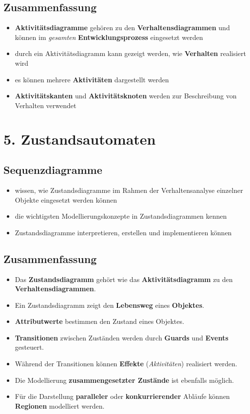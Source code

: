 \subsection*{Zusammenfassung}

\begin{itemize}
    \item \textbf{Aktivitätsdiagramme} gehören zu den \textbf{Verhaltensdiagrammen} und können im \textit{gesamten} \textbf{Entwicklungsprozess} eingesetzt werden
    \item durch ein Aktivitätsdiagramm kann gezeigt werden, wie \textbf{Verhalten} realisiert wird
    \item es können mehrere \textbf{Aktivitäten} dargestellt werden
    \item \textbf{Aktivitätskanten} und \textbf{Aktivitätsknoten} werden zur Beschreibung von Verhalten verwendet
\end{itemize}

\section*{5. Zustandsautomaten}

\subsection*{Sequenzdiagramme}
\begin{itemize}
    \item wissen, wie Zustandsdiagramme im Rahmen der Verhaltensanalyse einzelner Objekte eingesetzt werden können
    \item die wichtigsten Modellierungskonzepte in Zustandsdiagrammen kennen
    \item Zustandsdiagramme interpretieren, erstellen und implementieren können
\end{itemize}

\subsection*{Zusammenfassung}

\begin{itemize}
    \item Das \textbf{Zustandsdiagramm} gehört wie das \textbf{Aktivitätsdiagramm} zu den \textbf{Verhaltensdiagrammen}.
    \item Ein Zustandsdiagramm zeigt den \textbf{Lebensweg} eines \textbf{Objektes}.
    \item \textbf{Attributwerte} bestimmen den Zustand eines Objektes.
    \item \textbf{Transitionen} zwischen Zuständen werden durch \textbf{Guards} und \textbf{Events} gesteuert.
    \item Während der Transitionen können \textbf{Effekte} (\textit{Aktivitäten}) realisiert werden.
    \item Die Modellierung \textbf{zusammengesetzter Zustände} ist ebenfalls möglich.
    \item Für die Darstellung \textbf{paralleler} oder  \textbf{konkurrierender} Abläufe können \textbf{Regionen} modelliert werden.
\end{itemize}